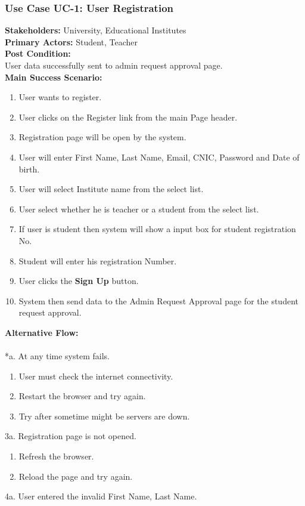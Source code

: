 \documentclass[12pt]{article}
\begin{document}
\subsubsection{Use Case UC-1: User Registration}
\textbf{Stakeholders: } University, Educational Institutes \\
\textbf{Primary Actors: } Student, Teacher \\
\textbf{Post Condition: }\\
User data successfully sent to admin request approval page.\\
\textbf{Main Success Scenario: }
\begin{enumerate}
\item User wants to register.
\item User clicks on the Register link from the main Page header.
\item Registration page will be open by the system.
\item User will enter First Name, Last Name, Email, CNIC, Password and Date of birth.
\item User will select Institute name from the select list.
\item User select whether he is teacher or a student from the select list.
\item If user is student then system will show a input box for student registration No.
\item Student will enter his registration Number.
\item User clicks the \textbf{Sign Up} button.
\item System then send data to the Admin Request Approval page for the student request approval. 
\end{enumerate}
\textbf{Alternative Flow: }\\
\\
*a. At any time system fails.
\begin{enumerate}
\item User must check the internet connectivity.
\item Restart the browser and try again.
\item Try after sometime might be servers are down.
\end{enumerate}
3a. Registration page is not opened.
\begin{enumerate}
\item Refresh the browser.
\item Reload the page and try again.
\end{enumerate}
4a. User entered the invalid First Name, Last Name.
\end{document}
